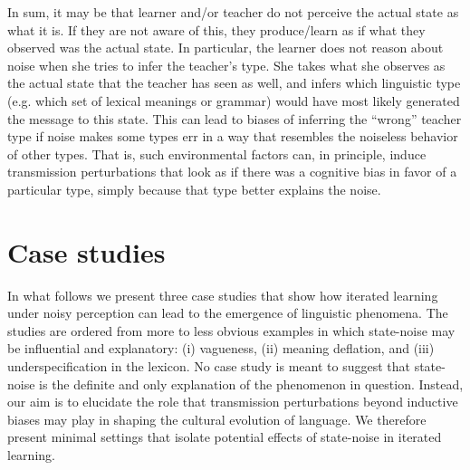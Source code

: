 \documentclass[10pt,a4paper]{article}
\newcommand{\citeposs}[2][]{\citeauthor{#2}'s (\citeyear[#1]{#2})}
\begin{document}
In sum, it may be that learner and/or teacher do not perceive the actual state as what
it is. If they are not aware of this, they produce/learn as if what they observed was the
actual state. In particular, the learner does not reason about noise when she tries to infer
the teacher's type. She takes what she observes as the actual state that the teacher has seen
as well, and infers which linguistic type (e.g. which set of lexical meanings or grammar) would have
most likely generated the message to this state. This
can lead to biases of inferring the ``wrong'' teacher type if noise makes some types err in a
way that resembles the noiseless behavior of other types. That is, such environmental factors
can, in principle, induce transmission perturbations that look as if there was a cognitive bias
in favor of a particular type, simply because that type better explains the noise.


\section{Case studies}

In what follows we present three case studies that show how iterated learning under noisy
perception can lead to the emergence of linguistic phenomena. The 
studies are ordered from more to less obvious examples in which state-noise may be influential
and explanatory: (i) vagueness, (ii) meaning deflation, and (iii) underspecification in the
lexicon.
No case study is meant to suggest that state-noise is the definite and only explanation of the
phenomenon in question. Instead, our aim is to elucidate the role that transmission perturbations beyond
inductive biases may play in shaping the cultural evolution of language. We therefore present
minimal settings that isolate potential effects of state-noise in iterated learning.
\end{document}
